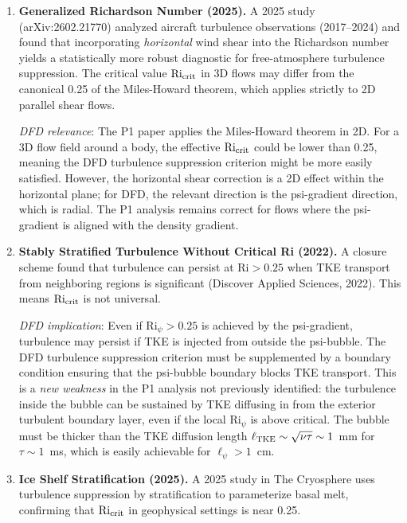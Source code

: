 \documentclass[11pt,twocolumn]{article}
\newcommand{\Ri}{\mathrm{Ri}}
\begin{document}
\begin{enumerate}[noitemsep]
\item \textbf{Generalized Richardson Number (2025).} A 2025 study
  (arXiv:2602.21770) analyzed aircraft turbulence observations (2017--2024)
  and found that incorporating \emph{horizontal} wind shear into the Richardson
  number yields a statistically more robust diagnostic for free-atmosphere
  turbulence suppression. The critical value $\Ri_{\rm crit}$ in 3D flows
  may differ from the canonical 0.25 of the Miles-Howard theorem, which
  applies strictly to 2D parallel shear flows.

  \emph{DFD relevance}: The P1 paper applies the Miles-Howard theorem in 2D.
  For a 3D flow field around a body, the effective $\Ri_{\rm crit}$ could
  be lower than 0.25, meaning the DFD turbulence suppression criterion might
  be more easily satisfied. However, the horizontal shear correction is a
  2D effect within the horizontal plane; for DFD, the relevant direction is
  the psi-gradient direction, which is radial. The P1 analysis remains correct
  for flows where the psi-gradient is aligned with the density gradient.

\item \textbf{Stably Stratified Turbulence Without Critical Ri (2022).}
  A closure scheme found that turbulence can persist at $\Ri > 0.25$ when
  TKE transport from neighboring regions is significant (Discover Applied
  Sciences, 2022). This means $\Ri_{\rm crit}$ is not universal.

  \emph{DFD implication}: Even if $\Ri_\psi > 0.25$ is achieved by the
  psi-gradient, turbulence may persist if TKE is injected from outside the
  psi-bubble. The DFD turbulence suppression criterion must be supplemented
  by a boundary condition ensuring that the psi-bubble boundary blocks TKE
  transport. This is a \emph{new weakness} in the P1 analysis not previously
  identified: the turbulence inside the bubble can be sustained by TKE
  diffusing in from the exterior turbulent boundary layer, even if the local
  $\Ri_\psi$ is above critical. The bubble must be thicker than the TKE
  diffusion length $\ell_{\rm TKE} \sim \sqrt{\nu\tau} \sim 1$~mm for
  $\tau \sim 1$~ms, which is easily achievable for $\ell_\psi > 1$~cm.

\item \textbf{Ice Shelf Stratification (2025).} A 2025 study in The Cryosphere
  uses turbulence suppression by stratification to parameterize basal melt,
  confirming that $\Ri_{\rm crit}$ in geophysical settings is near 0.25.
\end{enumerate}
\end{document}

